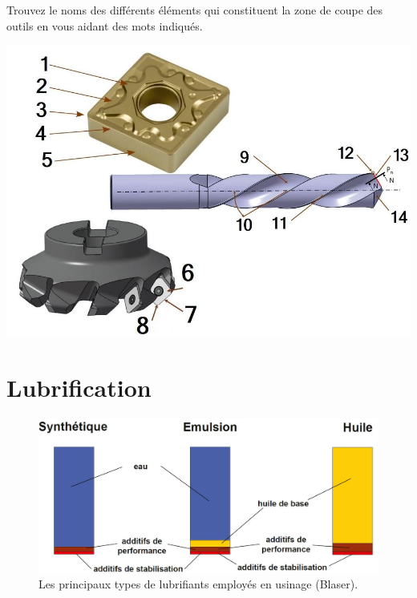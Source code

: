 \documentclass[12pt]{article}
\newcounter{exo}
\newenvironment{exo}{\stepcounter{exo}\vspace{0.5cm}{\bfseries Question \theexo\ :}}{\par\vspace{0.5cm}}
\begin{document}
\begin{exo} Trouvez le noms des différents éléments qui constituent la zone de coupe des outils en vous aidant des mots indiqués.\end{exo}
\begin{center}
\includegraphics[width=1\linewidth]{Images/PLA20.JPG}
\end{center}





\section{Lubrification}
\begin{figure}[h]
\centering
\includegraphics[width=0.7\linewidth]{Images/LU1.JPG}
\caption{Les principaux types de lubrifiants employés en usinage (Blaser).}
\label{bridppe}
\end{figure}
\end{document}
